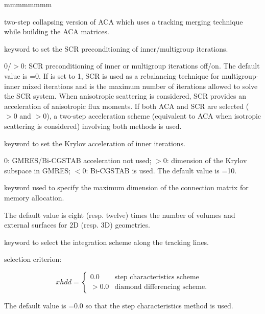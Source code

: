 \begin{ListeDeDescription}{mmmmmmmm}
\item[\moc{TMT}] two-step collapsing version of ACA which uses a tracking merging technique while building the ACA matrices. 

\item[\moc{SCR}] keyword to set the SCR preconditioning of inner/multigroup
iterations.\cite{gmres}

\item[\dusa{iscr}] $0$/$>0$: SCR preconditioning of inner or multigroup iterations off/on. The default value is =0. If  is set to 1, SCR is used as a rebalancing technique for multigroup-inner mixed iterations and  is the maximum number of iterations allowed to solve the SCR system. When anisotropic scattering is considered, SCR provides an acceleration of anisotropic flux moments. If both ACA and SCR are selected ($>0$ and $>0$), a two-step acceleration scheme (equivalent to ACA when isotropic scattering is considered) involving both methods is used.

\item[\moc{KRYL}] keyword to set the Krylov acceleration of inner iterations.\cite{gmres}

\item[\dusa{ikryl}] $0$: GMRES/Bi-CGSTAB acceleration not used; $>0$: dimension of the Krylov subspace in GMRES; $<0$: Bi-CGSTAB is used.
The default value is =10.

\item[\moc{MCU}] keyword used to specify the maximum dimension of the connection matrix for memory allocation.

\item[\dusa{imcu}] The default value is eight (resp. twelve) times the number of volumes and external surfaces for 2D (resp. 3D) geometries.

\item[\moc{HDD}] keyword to select the integration scheme along the tracking lines.

\item[\dusa{xhdd}] selection criterion:

$$
xhdd = \left\{
\begin{array}{rl}
 0.0 & \textrm{step characteristics scheme} \\
>0.0 & \textrm{diamond differencing scheme.}
\end{array} \right.
$$

The default value is =0.0 so that the step characteristics method is used.


\end{ListeDeDescription}
